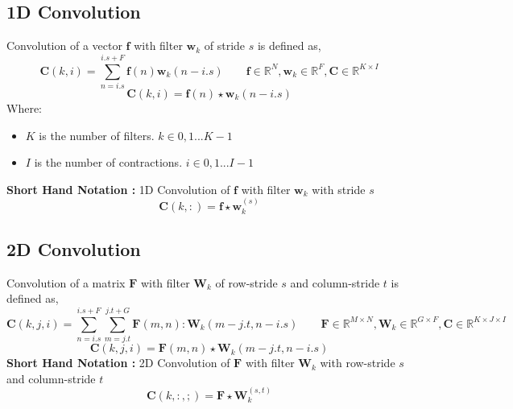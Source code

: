 \begin{appendices}
\subsection{1D Convolution}
Convolution of a vector $\textbf{f}$ with filter $\textbf{w}_{k}$ of stride $s$ is defined as, 
\begin{equation}
\textbf{C}(k, i) = \displaystyle\sum_{n=i.s}^{i.s + F}\textbf{f}(n)\textbf{w}_{k}(n-i.s) \qquad \textbf{f} \in \mathbb{R}^{N}, \textbf{w}_{k} \in \mathbb{R}^{F}, \textbf{C} \in \mathbb{R}^{K \times I}
\end{equation}
\[
\textbf{C}(k,i) = \textbf{f}(n)\star\textbf{w}_{k}(n-i.s)
\]
Where:
\begin{itemize}[label=]
    \setlength\itemsep{0em}
    \item $K$ is the number of filters. $k \in {0,1...K-1}$ 
    \item $I$ is the number of contractions. $i \in {0,1...I-1}$
\end{itemize}
\textbf{Short Hand Notation :} 1D Convolution of $\textbf{f}$ with filter $\textbf{w}_{k}$ with stride $s$
\[
\boxed{
\textbf{C}(k,:) = \textbf{f}\star\textbf{w}^{(s)}_{k}
}  
\]

\subsection{2D Convolution}
Convolution of a matrix $\textbf{F}$ with filter $\textbf{W}_{k}$ of row-stride $s$ and column-stride $t$ is defined as, 
\begin{equation}
\textbf{C}(k, j, i) = \displaystyle\sum_{n=i.s}^{i.s + F}\displaystyle\sum_{m=j.t}^{j.t + G}\textbf{F}(m,n):\textbf{W}_{k}(m-j.t, n-i.s) \qquad \textbf{F} \in \mathbb{R}^{M \times N}, \textbf{W}_{k} \in \mathbb{R}^{G \times F}, \textbf{C} \in \mathbb{R}^{K \times J \times I}
\end{equation}
\[
\textbf{C}(k,j,i) = \textbf{F}(m,n)\star\textbf{W}_{k}(m-j.t, n-i.s)
\]
\textbf{Short Hand Notation :} 2D Convolution of $\textbf{F}$ with filter $\textbf{W}_{k}$ with row-stride $s$ and column-stride $t$
\[
\boxed{
\textbf{C}(k,:,;) = \textbf{F}\star\textbf{W}^{(s,t)}_{k}
}  
\]

\end{appendices}
